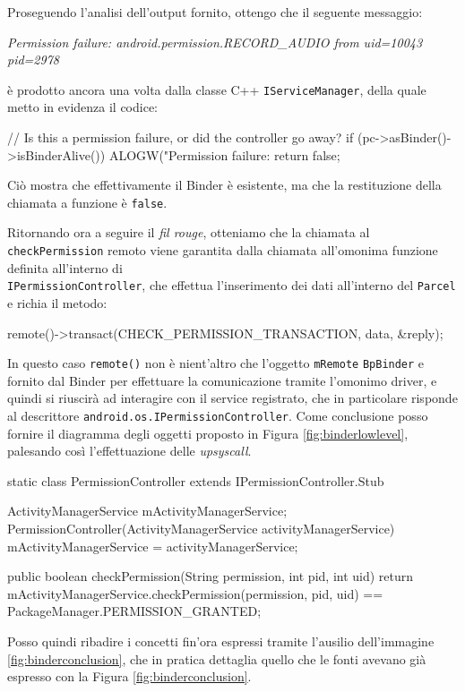 Proseguendo l'analisi dell'output fornito, ottengo che il seguente messaggio:
\begin{center}
\textit{Permission failure: android.permission.RECORD\_AUDIO from uid=10043 pid=2978}
\end{center}
è prodotto ancora una volta dalla classe C++ \texttt{IServiceManager}, della quale
metto in evidenza il codice:
\begin{cpp}
// Is this a permission failure, or did the controller go away?
if (pc->asBinder()->isBinderAlive()) {
   ALOGW("Permission failure: %
   return false;
}
\end{cpp}
Ciò mostra che effettivamente il Binder è esistente, ma che la restituzione
della chiamata a funzione è \texttt{\small false}.

Ritornando ora a seguire il \textit{fil rouge}, otteniamo che 
la chiamata al \texttt{\small checkPermission} remoto viene garantita dalla chiamata all'omonima
funzione definita all'interno di\\ \texttt{\small IPermissionController}, che effettua
l'inserimento dei dati all'interno del \texttt{Parcel} e richia il metodo:
\begin{cpp}
remote()->transact(CHECK_PERMISSION_TRANSACTION, data, &reply);
\end{cpp}
In questo caso \texttt{\small remote()} non è nient'altro che l'oggetto \texttt{\small mRemote}
\texttt{\small BpBinder} e fornito dal Binder per effettuare la
comunicazione tramite l'omonimo driver, e quindi si riuscirà ad interagire con il
service registrato, che in particolare risponde al descrittore \texttt{\small android.os.IPermissionController}.
Come conclusione posso fornire 
il diagramma degli oggetti proposto in Figura
\vref{fig:binderlowlevel}, palesando così l'effettuazione delle
\textit{upsyscall}.

\begin{java}
static class PermissionController extends IPermissionController.Stub {
        ActivityManagerService mActivityManagerService;
        PermissionController(ActivityManagerService activityManagerService) {
            mActivityManagerService = activityManagerService;
        }

        public boolean checkPermission(String permission, int pid, int uid) {
            return mActivityManagerService.checkPermission(permission, pid,
                    uid) == PackageManager.PERMISSION_GRANTED;
        }
}
\end{java}

Posso quindi ribadire i concetti fin'ora espressi tramite l'ausilio dell'immagine
 \vref{fig:binderconclusion}, che in pratica dettaglia
quello che le fonti avevano già espresso con la Figura 
\vref{fig:binderconclusion}.



